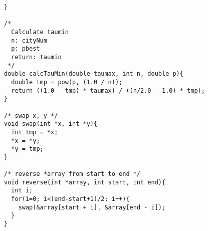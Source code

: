\documentclass[a4j]{jsarticle}
\begin{document}
\begin{lstlisting}[caption=MMAS2opt.c, label=MMAS2opt, xleftmargin=1cm]
}

/*
  Calculate taumin
  n: cityNum
  p: pbest
  return: taumin
 */
double calcTauMin(double taumax, int n, double p){
  double tmp = pow(p, (1.0 / n));
  return ((1.0 - tmp) * taumax) / ((n/2.0 - 1.0) * tmp);
}

/* swap x, y */
void swap(int *x, int *y){
  int tmp = *x;
  *x = *y;
  *y = tmp;
}

/* reverse *array from start to end */
void reverse(int *array, int start, int end){
  int i;
  for(i=0; i<(end-start+1)/2; i++){
    swap(&array[start + i], &array[end - i]);      
  }
}
\end{lstlisting}
\end{document}
